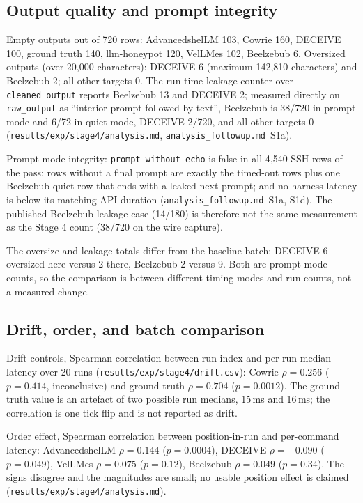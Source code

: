 \documentclass[a4paper,11pt]{article}
\begin{document}
\subsection{Output quality and prompt integrity}
\label{sec:s4-quality}

Empty outputs out of 720 rows: AdvancedshelLM 103, Cowrie 160, DECEIVE 100,
ground truth 140, llm-honeypot 120, VelLMes 102, Beelzebub 6. Oversized outputs
(over 20,000 characters): DECEIVE 6 (maximum 142,810 characters) and Beelzebub
2; all other targets 0. The run-time leakage counter over
\texttt{cleaned\_output} reports Beelzebub 13 and DECEIVE 2; measured directly
on \texttt{raw\_output} as ``interior prompt followed by text'', Beelzebub is
38/720 in prompt mode and 6/72 in quiet mode, DECEIVE 2/720, and all other
targets 0 (\texttt{results/exp/stage4/analysis.md},
\texttt{analysis\_followup.md}~S1a).

Prompt-mode integrity: \texttt{prompt\_without\_echo} is false in all 4,540
SSH rows of the pass; rows without a final prompt are exactly the timed-out
rows plus one Beelzebub quiet row that ends with a leaked next prompt; and no
harness latency is below its matching API duration
(\texttt{analysis\_followup.md}~S1a, S1d). The published Beelzebub leakage case
(14/180) is therefore not the same measurement as the Stage 4 count
(38/720 on the wire capture).

The oversize and leakage totals differ from the baseline batch: DECEIVE 6
oversized here versus 2 there, Beelzebub 2 versus 9. Both are prompt-mode
counts, so the comparison is between different timing modes and run counts,
not a measured change.

\subsection{Drift, order, and batch comparison}

Drift controls, Spearman correlation between run index and per-run median
latency over 20 runs (\texttt{results/exp/stage4/drift.csv}): Cowrie
$\rho=0.256$ ($p=0.414$, inconclusive) and ground truth $\rho=0.704$
($p=0.0012$). The ground-truth value is an artefact of two possible run
medians, 15\,ms and 16\,ms; the correlation is one tick flip and is not
reported as drift.

Order effect, Spearman correlation between position-in-run and per-command
latency: AdvancedshelLM $\rho=0.144$ ($p=0.0004$), DECEIVE $\rho=-0.090$
($p=0.049$), VelLMes $\rho=0.075$ ($p=0.12$), Beelzebub $\rho=0.049$
($p=0.34$). The signs disagree and the magnitudes are small; no usable
position effect is claimed (\texttt{results/exp/stage4/analysis.md}).
\end{document}
